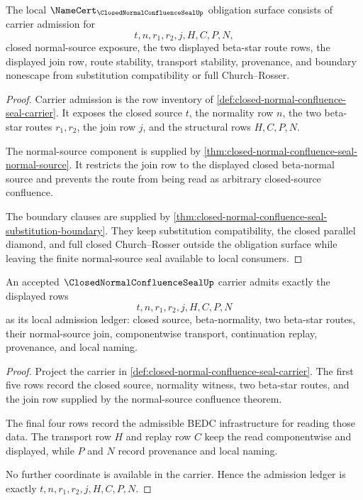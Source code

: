 \begin{theorem}
\label{thm:closed-normal-confluence-seal-obligation-surface}
The local $\NameCert_{\ClosedNormalConfluenceSealUp}$ obligation surface consists of carrier admission for
$$
t,n,r_1,r_2,j,H,C,P,N,
$$
closed normal-source exposure, the two displayed beta-star route rows, the displayed join row, route stability, transport stability, provenance, and boundary nonescape from substitution compatibility or full Church--Rosser.
\end{theorem}
\begin{proof}
Carrier admission is the row inventory of \autoref{def:closed-normal-confluence-seal-carrier}. It exposes the closed source $t$, the normality row $n$, the two beta-star routes $r_1,r_2$, the join row $j$, and the structural rows $H,C,P,N$.

The normal-source component is supplied by \autoref{thm:closed-normal-confluence-seal-normal-source}. It restricts the join row to the displayed closed beta-normal source and prevents the route from being read as arbitrary closed-source confluence.

The boundary clauses are supplied by \autoref{thm:closed-normal-confluence-seal-substitution-boundary}. They keep substitution compatibility, the closed parallel diamond, and full closed Church--Rosser outside the obligation surface while leaving the finite normal-source seal available to local consumers.
\end{proof}

\begin{theorem}
\label{thm:closed-normal-confluence-seal-carrier-admission-ledger}
An accepted $\ClosedNormalConfluenceSealUp$ carrier admits exactly the displayed
rows
$$
t,n,r_1,r_2,j,H,C,P,N
$$
as its local admission ledger: closed source, beta-normality, two beta-star
routes, their normal-source join, componentwise transport, continuation replay,
provenance, and local naming.
\end{theorem}
\begin{proof}
Project the carrier in
\autoref{def:closed-normal-confluence-seal-carrier}. The first five rows
record the closed source, normality witness, two beta-star routes, and the join
row supplied by the normal-source confluence theorem.

The final four rows record the admissible BEDC infrastructure for reading
those data. The transport row $H$ and replay row $C$ keep the read componentwise
and displayed, while $P$ and $N$ record provenance and local naming.

No further coordinate is available in the carrier. Hence the admission ledger
is exactly $t,n,r_1,r_2,j,H,C,P,N$.
\end{proof}

